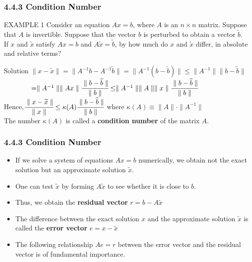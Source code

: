 \documentclass[notheorems,mathserif,table,compress]{beamer}  %
\begin{document}
\begin{frame}
  \frametitle{4.4.3 Condition Number}
  \begin{block}{EXAMPLE 1}
  Consider an equation $Ax=b$, where $A$ is an $n\times n$ matrix. Suppose that $A$ is invertible. Suppose that the vector $b$ is perturbed to obtain a vector $\widetilde{b}$. If $x$ and $\widetilde{x}$ satisfy $Ax=b$ and $A\widetilde{x}=\widetilde{b}$, by how much do $x$ and $\widetilde{x}$ differ, in absolute and relative terms?
  \end{block}
  \begin{block}{Solution}
  $\parallel x-\widetilde{x}\parallel=\parallel A^{-1}b-A^{-1}\widetilde{b}\parallel=\parallel A^{-1}(b-\widetilde{b})\parallel \le \parallel A^{-1}\parallel \parallel b-\widetilde{b}\parallel$\\ 
  $\quad \quad \quad \quad=\parallel A^{-1}\parallel \parallel Ax \parallel \cfrac{\parallel b-\widetilde{b}\parallel}{\parallel b\parallel}\le \parallel A^{-1}\parallel \parallel A\parallel \parallel x\parallel \cfrac{\parallel b-\widetilde{b}\parallel}{\parallel b\parallel}$\\
  Hence,\quad$\cfrac{\parallel x-\widetilde{x}\parallel}{\parallel x\parallel}\le \kappa(A)\cfrac{\parallel b-\widetilde{b}\parallel}{\parallel b\parallel}$
  \quad where \quad $\kappa(A)\equiv \parallel A\parallel \cdot \parallel A^{-1}\parallel$\\
  The number $\kappa(A)$ is called a \textbf{condition number} of the matrix $A$.
  \end{block}
\end{frame}


\begin{frame}
  \frametitle{4.4.3 Condition Number}
  \begin{itemize}
  \item If we solve a system of equations $Ax=b$ numerically, we obtain not the exact solution but an approximate solution $\widetilde{x}$.
  \item One can test $\widetilde{x}$ by forming $A\widetilde{x}$ to see whether it is close to $b$.
  \item Thus, we obtain the \textbf{residual vector} $r=b-A\widetilde{x}$
  \item The difference between the exact solution $x$ and the approximate solution $\widetilde{x}$ is called the \textbf{error vector} $e=x-\widetilde{x}$
  \item The following relationship $Ae=r$ between the error vector and the residual vector is of fundamental importance.
  \end{itemize}
\end{frame}
\end{document}
